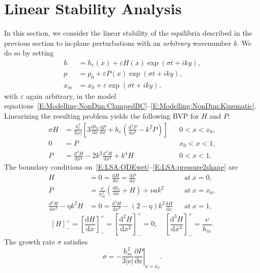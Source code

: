 \documentclass{jfm}
\newcommand{\dd}[2]{\frac{\mathrm{d} #1}{\mathrm{d} #2}}
\newcommand{\ddp}[2]{\frac{\partial #1}{\partial #2}}
\renewcommand{\Pi}{P}
\renewcommand{\Lambda}{H} %
\newcommand{\poisson}{\eta} %
\newcommand{\aspect}{a} %
\begin{document}
\section{Linear Stability Analysis}\label{S:LSA}
In this section, we consider the linear stability of the equilibria described in the previous section to in-plane perturbations with an \textit{arbitrary} wavenumber $k$. We do so by setting
\begin{align}
h &= h_e(x) + \varepsilon \Lambda(x)\exp(\sigma t + i k y),\label{E:LSA:Perturbation1} \\
 p &= p_0 + \varepsilon \Pi(x)\exp(\sigma t + i k y),\\ x_m  &= x_0 +  \varepsilon \exp(\sigma t + i k y),\label{E:LSA:Perturbation3}
\end{align}
with $\varepsilon$ again arbitrary, in the model equations~\eqref{E:Modelling:NonDim:ClampedBC}--\eqref{E:Modelling:NonDim:Kinematic}. Linearizing the resulting problem yields the following BVP for $\Lambda$ and $\Pi$:
\begin{align}
\sigma \Lambda &=  \frac{h_e^2}{3|\nu|}\left[3\dd{h_e}{x} \dd{\Pi}{x} + h_e\left(\dd{^2 \Pi}{x^2} - k^2 \Pi\right)\right] & &0 < x < x_0,\label{E:LSA:ODEwet}\\
0 &= \Pi & &x_0 < x < 1,\label{E:LSA:ODEdry}\\
\Pi &= \dd{^4 \Lambda}{x^4} - 2k^2 \dd{^2 \Lambda}{x^2} + k^4 \Lambda & & 0 < x <1.\label{E:LSA:pressure2shape}
\end{align}
The boundary conditions on~\eqref{E:LSA:ODEwet}--\eqref{E:LSA:pressure2shape} are
\begin{align}
\Lambda &= 0 = \dd{\Lambda}{x} = \dd{\Pi}{x} & &\text{at}~x = 0,\label{E:LSA:BC_at_0}\\
\Pi &= \frac{\nu}{h_m^2}\left(\dd{h_e}{x} + \Lambda\right) + \nu \aspect k^2 & &\text{at}~x = x_0,\label{E:LSA:pressure_bc}\\
\dd{^2 \Lambda}{x^2} - \poisson k^2
\Lambda &= 0 = \dd{^3 \Lambda}{x^3} - (2-\poisson)k^2 \dd{\Lambda}{x} & &\text{at}~x = 1,\label{E:LSA:BC_at_1}
\end{align}
\begin{equation}\label{E:LSA:jump_conds}
\left[\Lambda\right]_-^+= \left[\dd{\Lambda}{x}\right]_-^+ = \left[\dd{^2\Lambda}{x^2}\right]_-^+= 0, \quad\left[\dd{^3 \Lambda}{x^3}\right]_-^+ = \frac{\nu}{h_m }.
\end{equation}
The growth rate $\sigma$ satisfies
\begin{equation}\label{E:LSA:kinematic}
\sigma = -\frac{h_m^2}{3|\nu|}\left.\ddp{\Pi}{x}\right|_{x = x_0}.
\end{equation}
\end{document}
